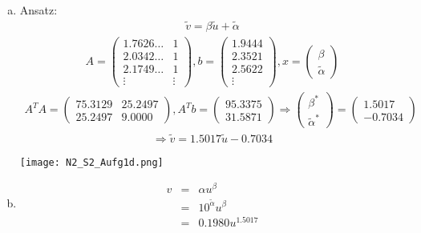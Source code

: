 \documentclass[11pt]{article} %
\begin{document}
\begin{enumerate}[a)]
\item Ansatz:
\begin{eqnarray*}
\tilde{v} = \beta\tilde{u} + \tilde{\alpha} 
\end{eqnarray*}
\begin{eqnarray*}
A = \begin{pmatrix}
1.7626\dots & 1 \\
2.0342\dots & 1 \\
2.1749\dots & 1 \\
\vdots & \vdots
\end{pmatrix},
b = \begin{pmatrix}
1.9444 \\ 2.3521 \\ 2.5622 \\ \vdots
\end{pmatrix},
x = \begin{pmatrix}\beta \\ \tilde{\alpha} \end{pmatrix}
\end{eqnarray*}
\begin{eqnarray*}
A^TA = \begin{pmatrix}  75.3129  &  25.2497 \\
   25.2497  &  9.0000 \end{pmatrix}, A^Tb = \begin{pmatrix}  95.3375 \\ 31.5871 \end{pmatrix}
 \Rightarrow \begin{pmatrix} \beta^* \\ \tilde{\alpha}^* \end{pmatrix} = \begin{pmatrix}  1.5017 \\
   -0.7034 \end{pmatrix}
\end{eqnarray*}
\begin{eqnarray*}
\Rightarrow \tilde{v} = 1.5017\tilde{u} - 0.7034
\end{eqnarray*}

\texttt{[image: N2\_S2\_Aufg1d.png]}

\item
\begin{eqnarray*}
v &=& \alpha u^\beta \\
&=& 10^{\tilde \alpha} u^\beta \\
&=&  0.1980 u^{1.5017}
\end{eqnarray*}


\end{enumerate}
\end{document}
